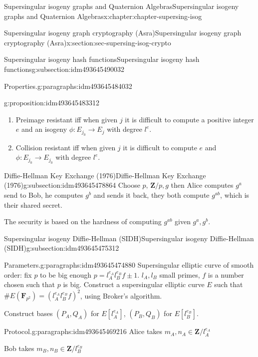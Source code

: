 \documentclass[oneside,10pt,]{book}
\numberwithin{equation}{section}
\newcommand{\lb}{[}
\newcommand{\rb}{]}
\newcommand{\ZZ}{\mathbf{Z}}
\newcommand{\FF}{\mathbf{F}}
\begin{document}
\begin{chapterptx}{Supersingular isogeny graphs and Quaternion Algebras}{}{Supersingular isogeny graphs and Quaternion Algebras}{}{}{x:chapter:chapter-supersing-isog}
\begin{sectionptx}{Supersingular isogeny graph cryptography (Asra)}{}{Supersingular isogeny graph cryptography (Asra)}{}{}{x:section:sec-supersing-isog-crypto}
\begin{subsectionptx}{Supersingular isogeny hash functions}{}{Supersingular isogeny hash functions}{}{}{g:subsection:idm493645490032}
\begin{paragraphs}{Properties.}{g:paragraphs:idm493645484032}
\begin{proposition}{}{}{g:proposition:idm493645483312}
\begin{enumerate}
\item{}Preimage resistant iff when given \(j\) it is difficult to compute a positive integer \(e\) and an isogeny \(\phi\colon E_{j_0} \to E_j\) with degree \(l^e\).%
\item{}Collision resistant iff when given \(j\) it is difficult to compute \(e\) and  \(\phi \colon E_{j_0} \to E_{j_0}\) with degree \(l^e\).%
\end{enumerate}
%
\end{proposition}
\end{paragraphs}%
\end{subsectionptx}
%
%
\typeout{************************************************}
\typeout{************************************************}
%
\begin{subsectionptx}{Diffie-Hellman Key Exchange (1976)}{}{Diffie-Hellman Key Exchange (1976)}{}{}{g:subsection:idm493645478864}
Choose \(p,\, \ZZ/p, g\) then Alice computes \(g^a\) send to Bob, he computes \(g^b\) and sends it back, they both compute \(g^{ab}\), which is their shared secret.%
\par
The security is based on the hardness of computing \(g^{ab}\) given \(g^a,g^b\).%
\end{subsectionptx}
%
%
\typeout{************************************************}
\typeout{************************************************}
%
\begin{subsectionptx}{Supersingular isogeny Diffie-Hellman (SIDH)}{}{Supersingular isogeny Diffie-Hellman (SIDH)}{}{}{g:subsection:idm493645475312}
\begin{paragraphs}{Parameters.}{g:paragraphs:idm493645474880}%
Supersingular elliptic curve of smooth order: fix \(p\) to be big enough \(p = l_A^{e_A} l_B^{e_B} f  \pm 1\). \(l_A,l_B\) small primes, \(f\) is a number chosen such that \(p\) is big. Construct a supersingular elliptic curve \(E\) such that \(\# E(\FF_{p^2}) = (l_A^{e_A}l_B^{e_B} f)^2\), using Broker's algorithm.%
\par
Construct bases \((P_A, Q_A)\) for \(E\lb l_A^{e_A}\rb\), \((P_B, Q_B)\) for \(E\lb l_B^{e_B}\rb\).%
\end{paragraphs}%
\begin{paragraphs}{Protocol.}{g:paragraphs:idm493645469216}%
Alice takes \(m_A,n_A \in \ZZ/l_A^{e_A}\)%
\par
Bob takes \(m_B,n_B \in \ZZ/l_B^{e_B}\)%
\par

\end{paragraphs}
\end{subsectionptx}
\end{sectionptx}
\end{chapterptx}
\end{document}
